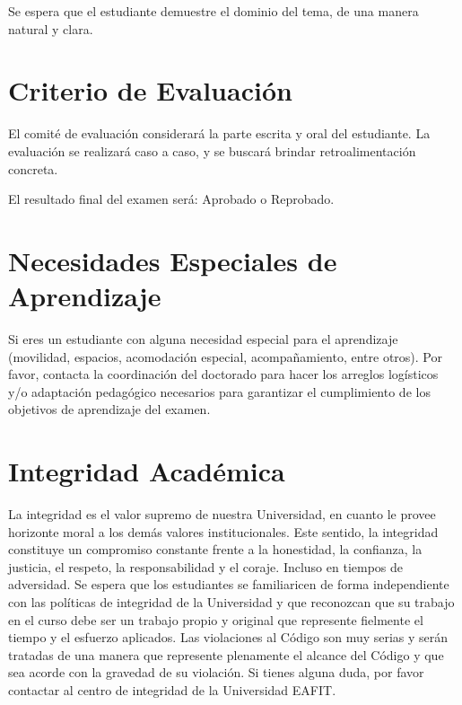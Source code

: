 Se espera que el estudiante demuestre el dominio del tema, de una manera natural y clara. 

\section{Criterio de Evaluación}

El comité de evaluación considerará la parte escrita y oral del estudiante. La evaluación se realizará caso a caso, y se buscará brindar retroalimentación concreta.

El resultado final del examen será: Aprobado o Reprobado.

\section{Necesidades Especiales de Aprendizaje}

Si eres un estudiante con alguna necesidad especial para el aprendizaje (movilidad, espacios, acomodación especial, acompañamiento, entre otros). Por favor, contacta la coordinación del doctorado \modalemail  para hacer los arreglos logísticos y/o adaptación pedagógico necesarios para garantizar el cumplimiento de los objetivos de aprendizaje del examen.

\section{Integridad Académica}

La integridad es el valor supremo de nuestra Universidad, en cuanto le provee horizonte moral a los demás valores institucionales. Este sentido, la integridad constituye un compromiso constante frente a la honestidad, la confianza, la justicia, el respeto, la responsabilidad y el coraje. Incluso en tiempos de adversidad. Se espera que los estudiantes se familiaricen de forma independiente con las políticas de integridad de la Universidad y que reconozcan que su trabajo en el curso debe ser un trabajo propio y original que represente fielmente el tiempo y el esfuerzo aplicados. Las violaciones al Código son muy serias y serán tratadas de una manera que represente plenamente el alcance del Código y que sea acorde con la gravedad de su violación. Si tienes alguna duda,  por favor contactar al centro de integridad de la Universidad EAFIT. 